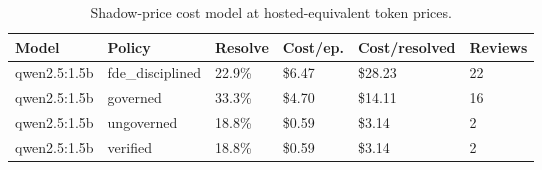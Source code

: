 \begin{table}[t]
\centering
\small
\caption{Shadow-price cost model at hosted-equivalent token prices.}
\label{tab:cost}
\begin{tabular}{llllll}
\toprule
Model & Policy & Resolve & Cost/ep. & Cost/resolved & Reviews \\
\midrule
qwen2.5:1.5b & fde\_disciplined & 22.9\% & \$6.47 & \$28.23 & 22 \\
qwen2.5:1.5b & governed & 33.3\% & \$4.70 & \$14.11 & 16 \\
qwen2.5:1.5b & ungoverned & 18.8\% & \$0.59 & \$3.14 & 2 \\
qwen2.5:1.5b & verified & 18.8\% & \$0.59 & \$3.14 & 2 \\
\bottomrule
\end{tabular}
\end{table}

